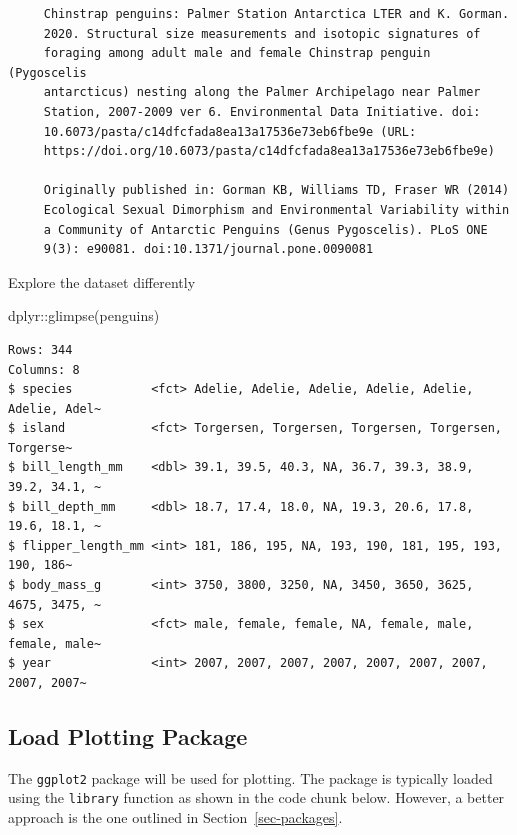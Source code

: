 \documentclass[
  letterpaper,
  DIV=11,
  numbers=noendperiod]{scrreprt}
\newenvironment{Shaded}{\begin{snugshade}}{\end{snugshade}}
\newcommand{\FunctionTok}[1]{\textcolor[rgb]{0.28,0.35,0.67}{#1}}
\newcommand{\NormalTok}[1]{\textcolor[rgb]{0.00,0.23,0.31}{#1}}
\newcommand{\SpecialCharTok}[1]{\textcolor[rgb]{0.37,0.37,0.37}{#1}}
\begin{document}
\begin{verbatim}
     Chinstrap penguins: Palmer Station Antarctica LTER and K. Gorman.
     2020. Structural size measurements and isotopic signatures of
     foraging among adult male and female Chinstrap penguin (Pygoscelis
     antarcticus) nesting along the Palmer Archipelago near Palmer
     Station, 2007-2009 ver 6. Environmental Data Initiative. doi:
     10.6073/pasta/c14dfcfada8ea13a17536e73eb6fbe9e (URL:
     https://doi.org/10.6073/pasta/c14dfcfada8ea13a17536e73eb6fbe9e)

     Originally published in: Gorman KB, Williams TD, Fraser WR (2014)
     Ecological Sexual Dimorphism and Environmental Variability within
     a Community of Antarctic Penguins (Genus Pygoscelis). PLoS ONE
     9(3): e90081. doi:10.1371/journal.pone.0090081
\end{verbatim}

Explore the dataset differently

\begin{Shaded}
\begin{Highlighting}[]
\NormalTok{dplyr}\SpecialCharTok{::}\FunctionTok{glimpse}\NormalTok{(penguins)}
\end{Highlighting}
\end{Shaded}

\begin{verbatim}
Rows: 344
Columns: 8
$ species           <fct> Adelie, Adelie, Adelie, Adelie, Adelie, Adelie, Adel~
$ island            <fct> Torgersen, Torgersen, Torgersen, Torgersen, Torgerse~
$ bill_length_mm    <dbl> 39.1, 39.5, 40.3, NA, 36.7, 39.3, 38.9, 39.2, 34.1, ~
$ bill_depth_mm     <dbl> 18.7, 17.4, 18.0, NA, 19.3, 20.6, 17.8, 19.6, 18.1, ~
$ flipper_length_mm <int> 181, 186, 195, NA, 193, 190, 181, 195, 193, 190, 186~
$ body_mass_g       <int> 3750, 3800, 3250, NA, 3450, 3650, 3625, 4675, 3475, ~
$ sex               <fct> male, female, female, NA, female, male, female, male~
$ year              <int> 2007, 2007, 2007, 2007, 2007, 2007, 2007, 2007, 2007~
\end{verbatim}

\subsection{Load Plotting Package}\label{load-plotting-package}

The \texttt{ggplot2} package will be used for plotting. The package is
typically loaded using the \texttt{library} function as shown in the
code chunk below. However, a better approach is the one outlined in
Section~\ref{sec-packages}.
\end{document}
